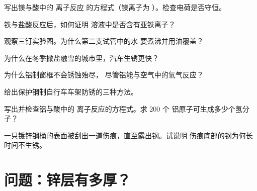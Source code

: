 \begin{exercise}[$\star\star$]\label{exo:g9:metals-acids-corrosion:5}
写出镁与酸中的  离子反应
的方程式（镁离子为 ）。检查电荷是否守恒。
\end{exercise}

\begin{exercise}[$\star\star$]\label{exo:g9:metals-acids-corrosion:6}
铁与盐酸反应后，如何证明
溶液中是否含有亚铁离子？
\end{exercise}

\begin{exercise}[$\star\star$]\label{exo:g9:metals-acids-corrosion:7}
观察三钉实验图。为什么第二支试管中的水
要煮沸并用油覆盖？
\end{exercise}

\begin{exercise}[$\star\star$]\label{exo:g9:metals-acids-corrosion:8}
为什么在冬季撒盐融雪的城市里，汽车生锈更快？
\end{exercise}

\begin{exercise}[$\star\star$]\label{exo:g9:metals-acids-corrosion:9}
为什么铝制窗框不会锈蚀殆尽，
尽管铝能与空气中的氧气反应？
\end{exercise}

\begin{exercise}[$\star\star$]\label{exo:g9:metals-acids-corrosion:10}
给出保护钢制自行车车架防锈的三种方法。
\end{exercise}

\begin{exercise}[$\star\star\star$]\label{exo:g9:metals-acids-corrosion:11}
写出并检查铝与酸中的
 离子反应的方程式。求 200 个
铝原子可生成多少个氢分子？
\end{exercise}

\begin{exercise}[$\star\star\star$]\label{exo:g9:metals-acids-corrosion:12}
一只镀锌钢桶的表面被刮出一道伤痕，直至露出钢。试说明
伤痕底部的钢为何长时间不生锈。
\end{exercise}

\section{问题：锌层有多厚？}

